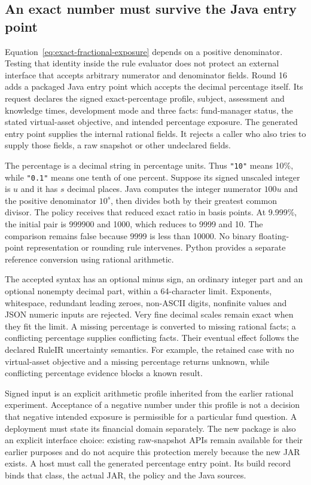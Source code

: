 \subsection{An exact number must survive the Java entry point}

Equation~\ref{eq:exact-fractional-exposure} depends on a positive denominator.
Testing that identity inside the rule evaluator does not protect an external
interface that accepts arbitrary numerator and denominator fields. Round 16
adds a packaged Java entry point which accepts the decimal percentage itself.
Its request declares the signed exact-percentage profile, subject, assessment
and knowledge times, development mode and three facts: fund-manager status,
the stated virtual-asset objective, and intended percentage exposure. The
generated entry point supplies the internal rational fields. It rejects a
caller who also tries to supply those fields, a raw snapshot or other
undeclared fields.

The percentage is a decimal string in percentage units. Thus \texttt{"10"}
means 10\%, while \texttt{"0.1"} means one tenth of one percent. Suppose its
signed unscaled integer is $u$ and it has $s$ decimal places. Java computes the
integer numerator $100u$ and the positive denominator $10^s$, then divides
both by their greatest common divisor. The policy receives that reduced exact
ratio in basis points. At 9.999\%, the initial pair is 999900 and 1000, which
reduces to 9999 and 10. The comparison remains false because 9999 is less than
10000. No binary floating-point representation or rounding rule intervenes.
Python provides a separate reference conversion using rational arithmetic.

The accepted syntax has an optional minus sign, an ordinary integer part and
an optional nonempty decimal part, within a 64-character limit. Exponents,
whitespace, redundant leading zeroes, non-ASCII digits, nonfinite values and
JSON numeric inputs are rejected. Very fine decimal scales remain exact when
they fit the limit. A missing percentage is converted to missing rational
facts; a conflicting percentage supplies conflicting facts. Their eventual
effect follows the declared RuleIR uncertainty semantics. For example, the
retained case with no virtual-asset objective and a missing percentage returns
unknown, while conflicting percentage evidence blocks a known result.

Signed input is an explicit arithmetic profile inherited from the earlier
rational experiment. Acceptance of a negative number under this profile is
not a decision that negative intended exposure is permissible for a particular
fund question. A deployment must state its financial domain separately. The
new package is also an explicit interface choice: existing raw-snapshot APIs
remain available for their earlier purposes and do not acquire this protection
merely because the new JAR exists. A host must call the generated percentage
entry point. Its build record binds that class, the actual JAR, the policy and
the Java sources.

